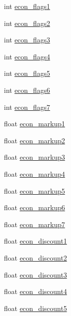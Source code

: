 \begin{DoxyCompactItemize}
\item 
int \hyperlink{structshop__data_a2866f6ee379dc15b50d876aed728dd28}{econ\-\_\-flags1}
\item 
int \hyperlink{structshop__data_a950ce03badf01891fe90c6709d9dceae}{econ\-\_\-flags2}
\item 
int \hyperlink{structshop__data_a953f0dfea4f31288dc63df7df28b4bbc}{econ\-\_\-flags3}
\item 
int \hyperlink{structshop__data_ac7e2b60177ac3d1651d61062707012bd}{econ\-\_\-flags4}
\item 
int \hyperlink{structshop__data_a46350daef3923e092fef130e4461ded4}{econ\-\_\-flags5}
\item 
int \hyperlink{structshop__data_af90b3b400a35a7f92a43bb967c818f19}{econ\-\_\-flags6}
\item 
int \hyperlink{structshop__data_afc11cbf459840e44d32535b4d3a6b532}{econ\-\_\-flags7}
\item 
float \hyperlink{structshop__data_a1ca7c008142b7938e0ddbd8595068dcd}{econ\-\_\-markup1}
\item 
float \hyperlink{structshop__data_a80a9e1e5976607032e88fa6535ee4d98}{econ\-\_\-markup2}
\item 
float \hyperlink{structshop__data_a22355b2cf50748a2573ff8c2ea7d97f0}{econ\-\_\-markup3}
\item 
float \hyperlink{structshop__data_a4d9cbe7b77e96d005f4a0ba55917c34f}{econ\-\_\-markup4}
\item 
float \hyperlink{structshop__data_ac2884ff62d213dfb4e29ecf670dbb484}{econ\-\_\-markup5}
\item 
float \hyperlink{structshop__data_a0dcc2a98b595471ec44ec1780edc5aba}{econ\-\_\-markup6}
\item 
float \hyperlink{structshop__data_af55ad1b9a01926e59260452bfe8b285d}{econ\-\_\-markup7}
\item 
float \hyperlink{structshop__data_a90f71cb6d60b8633740c789cb7c4742e}{econ\-\_\-discount1}
\item 
float \hyperlink{structshop__data_a331c6ca8314ae3954d10307d8b02514b}{econ\-\_\-discount2}
\item 
float \hyperlink{structshop__data_a9e11644d4ee8b564bdb6f93b5c020252}{econ\-\_\-discount3}
\item 
float \hyperlink{structshop__data_ae29d50f1eeeaaacaf18f15a23b51c787}{econ\-\_\-discount4}
\item 
float \hyperlink{structshop__data_a87dd58d0dc91230f96d561d5d33b4b72}{econ\-\_\-discount5}
\item 

\end{DoxyCompactItemize}

